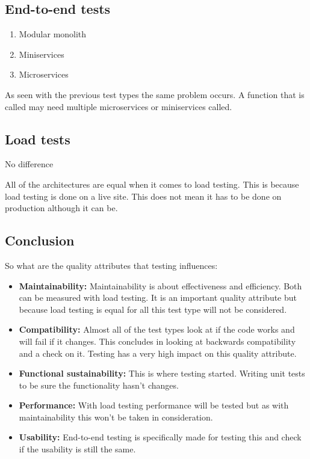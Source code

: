 \subsection{End-to-end tests}

\begin{enumerate}
        \item Modular monolith
        \item Miniservices
        \item Microservices
\end{enumerate}

As seen with the previous test types the same problem occurs. A function that is called may need multiple microservices or miniservices called.

\subsection{Load tests}

No difference

All of the architectures are equal when it comes to load testing. This is because load testing is done on a live site. This does not mean it has to be done on production although it can be.

\subsection{Conclusion}

So what are the quality attributes that testing influences:

\begin{itemize}
        \item \textbf{Maintainability:} Maintainability is about effectiveness and efficiency. Both can be measured with load testing. It is an important quality attribute but because load testing is equal for all this test type will not be considered.

        \item \textbf{Compatibility:} Almost all of the test types look at if the code works and will fail if it changes. This concludes in looking at backwards compatibility and a check on it. Testing has a very high impact on this quality attribute.

        \item \textbf{Functional sustainability:} This is where testing started. Writing unit tests to be sure the functionality hasn’t changes.

        \item \textbf{Performance:} With load testing performance will be tested but as with maintainability this won’t be taken in consideration.

        \item \textbf{Usability:} End-to-end testing is specifically made for testing this and check if the usability is still the same.
\end{itemize}

